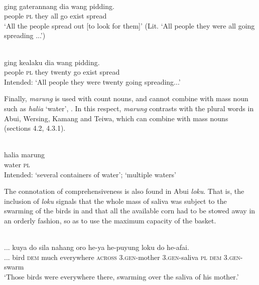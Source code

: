 \ea%
\label{ex:9:66}
 \\
 ging gaterannang dia wang pidding. \\
   people \textsc{pl} they all  go exist spread  \\
\glt `All the people spread out [to look for them]' \citep{Holton2012}
(Lit. `All people they were all going spreading ...')
\z








\ea%
\label{ex:9:67}
 \\
 ging kealaku dia wang pidding. \\
    people \textsc{pl} they twenty go exist spread \\
 \glt Intended: `All people they were twenty going spreading...'
\z






Finally, \textit{marung} is used with count nouns, and cannot combine with mass noun such as \textit{halia} `water', . In this respect, \textit{marung} contrasts with the plural words in Abui, Wersing, Kamang and Teiwa, which can combine with mass nouns (sections 4.2,  4.3.1).


\ea%
\label{ex:9:68}
 \\
\gll  *halia marung \\
   water \textsc{pl}  \\
 Intended: `several containers of water';  `multiple waters'
\z






The connotation of comprehensiveness is also found in Abui \textit{loku}. That is, the inclusion of \textit{loku} signals that the whole mass of saliva was subject to the swarming of the birds in  and that all the available corn had to be stowed away  in an orderly fashion, so as to use the maximum capacity of the basket.


\ea%
\label{ex:9:69}
 \\
\gll  ... {kuya} do sila nahang oro  he-ya he-puyung loku do he-afai. \\
   ...  bird \textsc{dem} much everywhere \textsc{across}   \textsc{3.gen}-mother \textsc{3.gen-}saliva \textsc{pl} \textsc{dem} \textsc{3.gen-}swarm \\
\glt `Those birds were everywhere there, swarming over the saliva of his mother.'
\z













